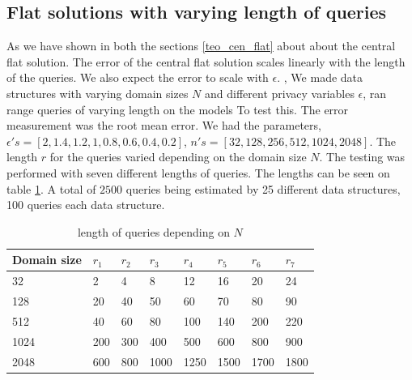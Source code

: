 \documentclass[11pt]{article}
\theoremstyle{definition}
\begin{document}
\subsection{Flat solutions with varying length of queries}
As we have shown in both the sections \ref{teo_cen_flat} about about the central flat solution. The error of the central flat solution scales linearly with the length of the queries. We also expect the error to scale with $\epsilon$. , We made data structures with varying domain sizes $N$ and different privacy variables $\epsilon$, ran range queries of varying length on the models To test this. The error measurement was the root mean error. 
We had the parameters, $\epsilon's = [2, 1.4, 1.2, 1, 0.8, 0.6, 0.4, 0.2]$, $n's = [32, 128, 256, 512, 1024, 2048]$. The length $r$ for the queries varied depending on the domain size $N$. The testing was performed with seven different lengths of queries. The lengths can be seen on table \ref{tab:cen_flat_r}. A total of $2500$ queries being estimated by 25 different data structures, 100 queries each data structure.
\begin{table}[H]
\centering
\begin{tabular}{|l|l|l|l|l|l|l|l|}
\hline
Domain size    & $r_1$ & $r_2$ & $r_3$ & $r_4$ & $r_5$ & $r_6$ & $r_7$\\ \hline
32   & 2        & 4        & 8        & 12       & 16       & 20       & 24       \\ \hline
128  & 20       & 40       & 50       & 60       & 70       & 80       & 90       \\ \hline
512  & 40       & 60       & 80       & 100      & 140      & 200      & 220      \\ \hline
1024 & 200      & 300      & 400      & 500      & 600      & 800      & 900      \\ \hline
2048 & 600      & 800      & 1000     & 1250     & 1500     & 1700     & 1800     \\ \hline
\end{tabular}
\caption{length of queries depending on $N$}
  \label{tab:cen_flat_r}
\end{table}
\end{document}
